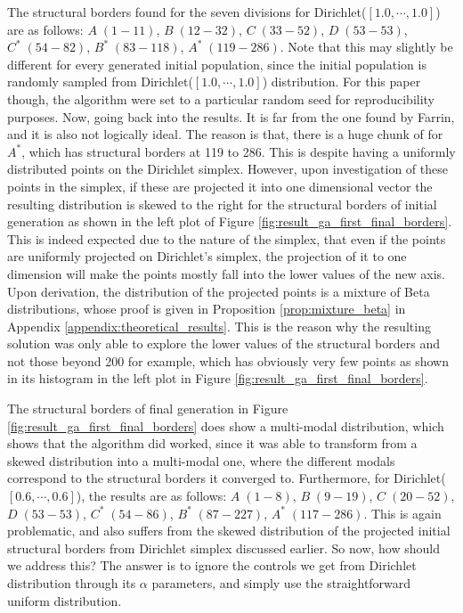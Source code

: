 The structural borders found for the seven divisions for Dirichlet($[1.0,\cdots,1.0]$) are as follows: $A\;(1-11)$, $B\;(12-32)$, $C\;(33-52)$, $D\;(53-53)$, $C^*\;(54-82)$, $B^*\;(83-118)$, $A^*\;(119-286)$. Note that this may slightly be different for every generated initial population, since the initial population is randomly sampled from Dirichlet($[1.0,\cdots,1.0]$) distribution. For this paper though, the algorithm were set to a particular random seed for reproducibility purposes. Now, going back into the results. It is far from the one found by Farrin, and it is also not logically ideal. The reason is that, there is a huge chunk of   for $A^*$, which has structural borders at 119 to 286. This is despite having a uniformly distributed points on the Dirichlet simplex. However, upon investigation of these points in the simplex, if these are projected it into one dimensional vector the resulting distribution is skewed to the right for the structural borders of initial generation as shown in the left plot of Figure \ref{fig:result_ga_first_final_borders}. This is indeed expected due to the nature of the simplex, that even if the points are uniformly projected on Dirichlet's simplex, the projection of it to one dimension will make the points mostly fall into the lower values of the new axis. Upon derivation, the distribution of the projected points is a  mixture of Beta distributions, whose proof is given in Proposition \ref{prop:mixture_beta} in Appendix \ref{appendix:theoretical_results}. This is the reason why the resulting solution was only able to explore the lower values of the structural borders and not those beyond 200 for example, which has obviously very few points as shown in its histogram in the left plot in Figure \ref{fig:result_ga_first_final_borders}.

The structural borders of final generation in Figure \ref{fig:result_ga_first_final_borders} does show a multi-modal distribution, which shows that the algorithm did worked, since it was able to transform from a skewed distribution into a multi-modal one, where the different modals correspond to the structural borders it converged to. Furthermore, for Dirichlet($[0.6,\cdots,0.6]$), the results are as follows: $A\;(1-8)$, $B\;(9-19)$, $C\;(20-52)$, $D\;(53-53)$, $C^*\;(54-86)$, $B^*\;(87-227)$, $A^*\;(117-286)$. This is again problematic, and also suffers from the skewed distribution of the projected initial structural borders from Dirichlet simplex discussed earlier. So now, how should we address this? The answer is to ignore the controls we get from Dirichlet distribution through its $\alpha$ parameters, and simply use the straightforward uniform distribution.

